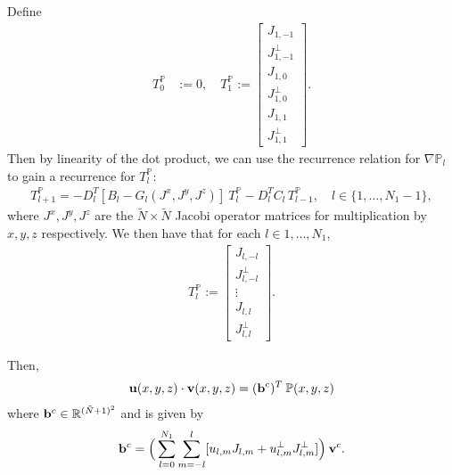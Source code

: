 \documentclass[11pt, oneside]{article}   	%
\newcommand{\R}{\mathbb{R}}
\newcommand{\bigP}{\mathbb{P}}
\newcommand{\gradPl}{\nabla\mathbb{P}_l}
\newcommand{\Dlt}{D^T_l}
\begin{document}
Define
\begin{align}
T^\bigP_0 &:= 0, \quad
T^\bigP_1 := \begin{bmatrix}
			J_{1,-1} \\
			J^\perp_{1,-1} \\
			J_{1,0} \\
			J^\perp_{1,0} \\
			J_{1,1} \\
			J^\perp_{1,1}
	  	\end{bmatrix}.
\end{align}
Then by linearity of the dot product, we can use the recurrence relation for \(\gradPl\) to gain a recurrence for \(T^\bigP_l\):
\begin{align}
T^\bigP_{l+1} = -\Dlt [B_l-G_l(J^x, J^y, J^z)] \: T^\bigP_l - \Dlt C_l  \, T^\bigP_{l-1}, \quad l \in \{1,\dots,N_1-1\},
\end{align}
where \(J^x, J^y, J^z\) are the \(\tilde{N} \times \tilde{N}\) Jacobi operator matrices for multiplication by \(x, y, z\) respectively. We then have that for each \(l \in {1,\dots,N_1}\), 
\begin{align}
T^\bigP_l := \begin{bmatrix}
			J_{l,-l} \\
			J^\perp_{l,-l} \\
			\vdots \\
			J_{l,l} \\
			J^\perp_{l,l}
	  	\end{bmatrix}.
\end{align}

Then, 
\begin{align}
\bold{u}(x,y,z) \cdot \bold{v}(x,y,z) = (\bold{b}^c)^T  \: \bigP(x,y,z)
\end{align}
where \(\bold{b}^c \in \R^{(\tilde{N}+1)^2}\) and is given by
\begin{align}
\bold{b}^c = \Big(\sum_{l=0}^{N_1} \sum_{m=-l}^{l} [ u_{l,m} J_{l,m} + u^{\perp}_{l,m} J^\perp_{l,m} ] \Big) \: \bold{v}^c.
\end{align}




\end{document}
